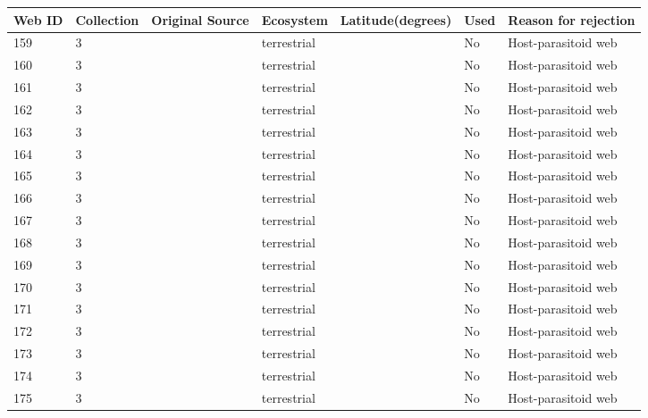 \documentclass[12pt]{article}
\begin{document}
\begin{landscape}
    \begin{table}[h!]
    \centering
    {\footnotesize
      \begin{tabular}{p{2.8cm}p{1.3cm}p{3cm}p{2.2cm}p{2.5cm}lp{8.2cm}}
        \hline
        Web ID & Collection & Original Source & Ecosystem & Latitude(degrees) & Used  & Reason for rejection  \\
        \hline
        159   & 3 & \cite{Askew1961}     & terrestrial &       & No    & Host-parasitoid web \\
        160   & 3 & \cite{Askew1961}     & terrestrial &       & No    & Host-parasitoid web \\
        161   & 3 & \cite{Askew1961}     & terrestrial &       & No    & Host-parasitoid web \\
        162   & 3 & \cite{Askew1961}     & terrestrial &       & No    & Host-parasitoid web \\
        163   & 3 & \cite{Askew1961}     & terrestrial &       & No    & Host-parasitoid web \\
        164   & 3 & \cite{Askew1961}     & terrestrial &       & No    & Host-parasitoid web \\
        165   & 3 & \cite{Askew1961}     & terrestrial &       & No    & Host-parasitoid web \\
        166   & 3 & \cite{Askew1961}     & terrestrial &       & No    & Host-parasitoid web \\
        167   & 3 & \cite{Askew1961}     & terrestrial &       & No    & Host-parasitoid web \\
        168   & 3 & \cite{Hawkins1984}    & terrestrial &       & No    & Host-parasitoid web \\
        169   & 3 & \cite{Hawkins1984}    & terrestrial &       & No    & Host-parasitoid web \\        
        170   & 3 & \cite{Hawkins1984}    & terrestrial &       & No    & Host-parasitoid web \\
        171   & 3 & \cite{Hawkins1984}    & terrestrial &       & No    & Host-parasitoid web \\      
        172   & 3 & \cite{Hawkins1984}    & terrestrial &       & No    & Host-parasitoid web \\
        173   & 3 & \cite{Hawkins1984}    & terrestrial &       & No    & Host-parasitoid web \\
        174   & 3 & \cite{Hawkins1984}    & terrestrial &       & No    & Host-parasitoid web \\
        175   & 3 & \cite{Hawkins1984}    & terrestrial &       & No    & Host-parasitoid web \\

\end{tabular}}
\end{table}
\end{landscape}
\end{document}
